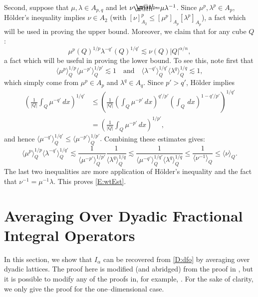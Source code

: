 \documentclass[12pt]{amsart}
\begin{document}
Second, suppose that $\mu, {\lambda} \in A_{p,q}$ and let $\nu {\mathrel{\rlap{                     \raisebox{0.3ex}{$\m@th\cdot$}}                     \raisebox{-0.3ex}{$\m@th\cdot$}}                     =} \mu{\lambda}^{-1}$. Since $\mu^p, {\lambda}^p \in A_p$, H\"older's inequality implies $\nu \in A_2$ (with $[\nu]_{A_2}^p \leq [\mu^p]_{A_p}[\lambda^p]_{A_p}$), a fact which will be used in proving the upper bound. Moreover, we claim that for any cube $Q$:
	\begin{equation} \label{E:wtEst}
	\mu^p(Q)^{1/p} {\lambda}^{-q'}(Q)^{1/q'} \lesssim \nu(Q) |Q|^{\alpha/n},
	\end{equation}
a fact which will be useful in proving the lower bound. To see this, note first that 
	\begin{equation*}
	{\langle } \mu^p{\rangle }_Q^{1/p} {\langle } \mu^{-p'}{\rangle }_Q^{1/p'} \lesssim 1 \:\:\:\text{ and }\:\:\:
	{\langle }{\lambda}^{-q'}{\rangle }_Q^{1/q'} {\langle } {\lambda}^q{\rangle }_Q^{1/q} \lesssim 1,
	\end{equation*}
which simply come from $\mu^p \in A_p$ and ${\lambda}^q \in A_q$. Since $p' > q'$, H\"older implies
	\begin{align*}\left( \frac{1}{|Q|} \int_Q \mu^{-q'}\,dx\right)^{1/q'}  &\leq \left( \frac{1}{|Q|} \left(\int_Q \mu^{-p'}\,dx\right)^{q'/p'} \left(\int_Q\,dx\right)^{1 - q'/p'}\right)^{1/q'}\\
	 &= \left( \frac{1}{|Q|} \int_Q \mu^{-p'}\,dx\right)^{1/p'},
	\end{align*}
and hence ${\langle } \mu^{-q'}{\rangle }_Q^{1/q'} \leq {\langle } \mu^{-p'}{\rangle }_Q^{1/p'}.$
Combining these estimates gives:
	$$ {\langle } \mu^p{\rangle }_Q^{1/p} {\langle } {\lambda}^{-q'}{\rangle }_Q^{1/q'} \lesssim
		\frac{1}{{\langle } \mu^{-p'}{\rangle }_Q^{1/p'}} \frac{1}{{\langle } {\lambda}^q{\rangle }_Q^{1/q}} \lesssim
		\frac{1}{ {\langle } \mu^{-q'}{\rangle }_Q^{1/q'} {\langle } {\lambda}^q{\rangle }_Q^{1/q} } \leq \frac{1}{{\langle }\nu^{-1}{\rangle }_Q} \leq {\langle } \nu{\rangle }_Q.$$
The last two inequalities are more application of H{\"o}lder's inequality and the fact that $\nu^{-1} = \mu^{-1}{\lambda}$.  This proves \eqref{E:wtEst}.
	
	

\section{Averaging Over Dyadic Fractional Integral Operators}
In this section, we show that $I_\alpha$ can be recovered
from \eqref{D:dfo}
by averaging over dyadic lattices. The proof here is modified
(and abridged) 
from the proof in \cite{PetTreVol2002}, but it is possible 
to modify any of the proofs in, for example, 
\cites{Pet2000,Hyt2008,Lac2009}. For the sake of clarity, we
only give the proof for the one--dimensional case.
\end{document}
